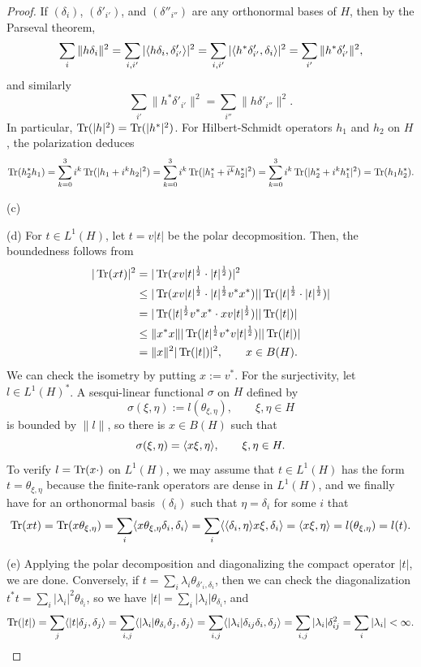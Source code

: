 \documentclass{../../large}
\begin{document}
\begin{proof}

If $(\delta_i)$, $(\delta'_{i'})$, and $(\delta''_{i''})$ are any orthonormal bases of $H$, then by the Parseval theorem,
\[\sum_i\|h\delta_i\|^2
=\sum_{i,i'}|\langle h\delta_i,\delta'_{i'}\rangle|^2
=\sum_{i,i'}|\langle h^*\delta'_{i'},\delta_i\rangle|^2
=\sum_{i'}\|h^*\delta'_{i'}\|^2,\]
and similarly
\[\sum_{i'}\|h^*\delta'_{i'}\|^2=\sum_{i''}\|h\delta'_{i''}\|^2.\]
In particular, $\operatorname{Tr}(|h|^2)=\operatorname{Tr}(|h^*|^2)$.
For Hilbert-Schmidt operators $h_1$ and $h_2$ on $H$, the polarization deduces
\[\operatorname{Tr}(h_2^*h_1)
=\sum_{k=0}^3i^k\operatorname{Tr}(|h_1+i^kh_2|^2)
=\sum_{k=0}^3i^k\operatorname{Tr}(|h_1^*+\overline{i^k}h_2^*|^2)
=\sum_{k=0}^3i^k\operatorname{Tr}(|h_2^*+i^kh_1^*|^2)
=\operatorname{Tr}(h_1h_2^*).\]

(c)


(d)
For $t\in L^1(H)$, let $t=v|t|$ be the polar decopmosition.
Then, the boundedness follows from
\begin{align*}
|\operatorname{Tr}(xt)|^2
&=|\operatorname{Tr}(xv|t|^{\frac12}\cdot|t|^{\frac12})|^2\\
&\le|\operatorname{Tr}(xv|t|^{\frac12}\cdot|t|^{\frac12}v^*x^*)||\operatorname{Tr}(|t|^{\frac12}\cdot|t|^{\frac12})|\\
&=|\operatorname{Tr}(|t|^{\frac12}v^*x^*\cdot xv|t|^{\frac12})||\operatorname{Tr}(|t|)|\\
&\le\|x^*x\||\operatorname{Tr}(|t|^{\frac12}v^*v|t|^{\frac12})||\operatorname{Tr}(|t|)|\\
&=\|x\|^2|\operatorname{Tr}(|t|)|^2,\qquad x\in B(H).
\end{align*}
We can check the isometry by putting $x:=v^*$.
For the surjectivity, let $l\in L^1(H)^*$.
A sesqui-linear functional $\sigma$ on $H$ defined by
\[\sigma(\xi,\eta):=l(\theta_{\xi,\eta}),\qquad\xi,\eta\in H\]
is bounded by $\|l\|$, so there is $x\in B(H)$ such that
\[\sigma(\xi,\eta)=\langle x\xi,\eta\rangle,\qquad\xi,\eta\in H.\]
To verify $l=\operatorname{Tr}(x\cdot)$ on $L^1(H)$, we may assume that $t\in L^1(H)$ has the form $t=\theta_{\xi,\eta}$ because the finite-rank operators are dense in $L^1(H)$, and we finally have for an orthonormal basis $(\delta_i)$ such that $\eta=\delta_i$ for some $i$ that
\[\operatorname{Tr}(xt)=\operatorname{Tr}(x\theta_{\xi,\eta})=\sum_i\langle x\theta_{\xi,\eta}\delta_i,\delta_i\rangle=\sum_i\langle\langle\delta_i,\eta\rangle x\xi,\delta_i\rangle=\langle x\xi,\eta\rangle=l(\theta_{\xi,\eta})=l(t).\]


(e)
Applying the polar decomposition and diagonalizing the compact operator $|t|$, we are done.
Conversely, if $t=\sum_i\lambda_i\theta_{\delta'_i,\delta_i}$, then we can check the diagonalization $t^*t=\sum_i|\lambda_i|^2\theta_{\delta_i}$, so we have $|t|=\sum_i|\lambda_i|\theta_{\delta_i}$, and
\[\operatorname{Tr}(|t|)=\sum_j\langle|t|\delta_j,\delta_j\rangle=\sum_{i,j}\langle|\lambda_i|\theta_{\delta_i}\delta_j,\delta_j\rangle=\sum_{i,j}\langle|\lambda_i|\delta_{ij}\delta_i,\delta_j\rangle=\sum_{i,j}|\lambda_i|\delta_{ij}^2=\sum_i|\lambda_i|<\infty.\]


\end{proof}
\end{document}
